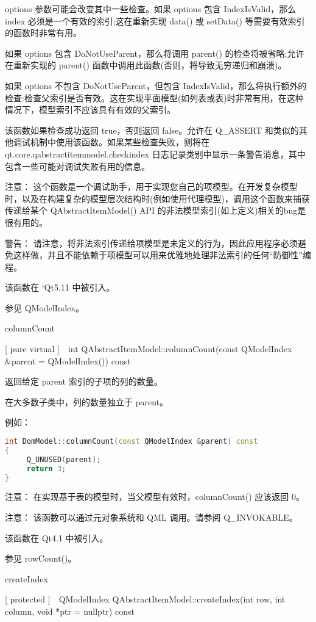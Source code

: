 options 参数可能会改变其中一些检查。如果 options 包含 IndexIsValid，那么 index 必须是一个有效的索引;这在重新实现 data() 或 setData() 等需要有效索引的函数时非常有用。

如果 options 包含 DoNotUseParent，那么将调用 parent() 的检查将被省略;允许在重新实现的 parent() 函数中调用此函数(否则，将导致无穷递归和崩溃)。

如果 options 不包含 DoNotUseParent，但包含 IndexIsValid，那么将执行额外的检查:检查父索引是否有效。这在实现平面模型(如列表或表)时非常有用，在这种情况下，模型索引不应该具有有效的父索引。

该函数如果检查成功返回 true，否则返回 false。允许在 Q\_ASSERT 和类似的其他调试机制中使用该函数。如果某些检查失败，则将在 qt.core.qabstractitemmodel.checkindex 日志记录类别中显示一条警告消息，其中包含一些可能对调试失败有用的信息。

注意： 这个函数是一个调试助手，用于实现您自己的项模型。在开发复杂模型时，以及在构建复杂的模型层次结构时(例如使用代理模型)，调用这个函数来捕获传递给某个 QAbstractItemModel() API 的非法模型索引(如上定义)相关的bug是很有用的。

警告： 请注意，将非法索引传递给项模型是未定义的行为，因此应用程序必须避免这样做，并且不能依赖于项模型可以用来优雅地处理非法索引的任何“防御性”编程。

该函数在 `Qt5.11 中被引入。

参见 QModelIndex。

columnCount

[ pure virtual ] int QAbstractItemModel::columnCount(const QModelIndex \&parent = QModelIndex()) const

返回给定 parent 索引的子项的列的数量。

在大多数子类中，列的数量独立于 parent。

例如：

\begin{lstlisting}[language=C++]
int DomModel::columnCount(const QModelIndex &parent) const
{
     Q_UNUSED(parent);
     return 3;
}
\end{lstlisting}


注意： 在实现基于表的模型时，当父模型有效时，columnCount() 应该返回 0。

注意： 该函数可以通过元对象系统和 QML 调用。请参阅 Q\_INVOKABLE。

该函数在 Qt4.1 中被引入。

参见 rowCount()。

createIndex

[ protected ] QModelIndex QAbstractItemModel::createIndex(int row, int column, void *ptr = nullptr) const

